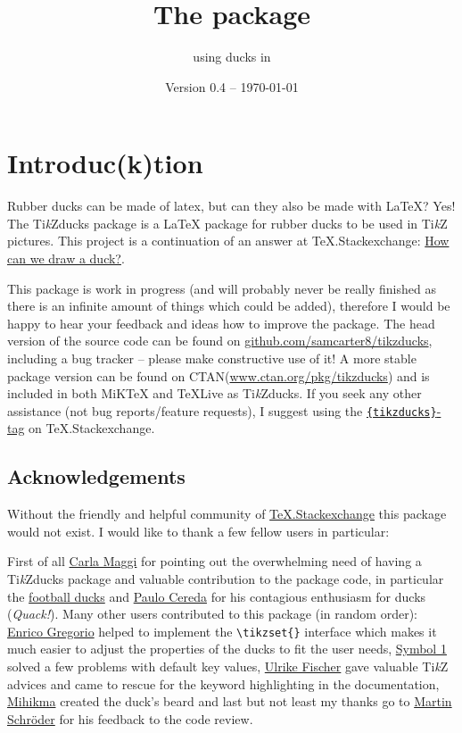 \documentclass[parskip=half]{scrartcl}
\title{The \texorpdfstring{\tikzducks}{tikzducks} package}
\subtitle{using ducks in \TikZ}
\author{%
	\texorpdfstring{\texttt{samcarter} (alias 
		\begin{tikzpicture}[scale=0.3,baseline=3pt]
			\duck[body=yellow!50!brown!50!white,
					longhair=red!50!brown, 
					jacket=blue!50!black]
		\end{tikzpicture})\\[0.8em]
		\url{https://github.com/samcarter8/tikzducks}\\
		\url{https://www.ctan.org/pkg/tikzducks}
	}{samcarter}}
\date{Version 0.4 -- \today}
\newcommand{\CTAN}{\textsc{CTAN}\xspace}
\newcommand{\TikZ}{Ti\emph{k}Z\xspace}
\newcommand{\tikzducks}{Ti\emph{k}Zducks\xspace}
\newcommand{\miktex}{MiK\TeX\xspace}
\newcommand{\texlive}{\TeX{}Live\xspace}
\begin{document}
\maketitle
\thispagestyle{scrheadings}

\section{Introduc(k)tion}
\label{intro}

Rubber ducks can be made of latex, but can they also be made with \LaTeX? Yes! The \tikzducks package is a \LaTeX{} package for rubber ducks to be used in \TikZ pictures. 
This project is a continuation of an answer at TeX.Stackexchange: \href{tex.stackexchange.com/a/347458/36296}{How can we draw a duck?}.

This package is work in progress (and will probably never be really finished as there is an infinite amount of things which could be added), therefore I would be happy to hear your feedback and ideas how to improve the package. 
The head version of the source code can be found on \url{github.com/samcarter8/tikzducks}, including a bug tracker -- please make constructive use of it! A more stable package version can be found on \CTAN (\url{www.ctan.org/pkg/tikzducks}) and is included in both \miktex and \texlive as \tikzducks. If you seek any other assistance (not bug reports/feature requests), I suggest using the \href{https://tex.stackexchange.com/questions/tagged/tikzducks}{\texttt{\{tikzducks\}}-tag} on TeX.Stackexchange.

\subsection{Acknowledgements}

Without the friendly and helpful community of \href{https://tex.stackexchange.com/}{TeX.Stackexchange} this package would not exist. I would like to thank a few fellow users in particular:

First of all \href{https://tex.stackexchange.com/users/101651/carlatex}{Carla Maggi} for pointing out the overwhelming need of having a \tikzducks package and valuable contribution to the package code, in particular the \hyperref[sec:footballducks]{football ducks} and \href{https://tex.stackexchange.com/users/3094/paulo-cereda}{Paulo Cereda} for his contagious enthusiasm for ducks (\emph{Quack!}). Many other users contributed to this package (in random order): \href{https://tex.stackexchange.com/users/4427/egreg}{Enrico Gregorio} helped to implement the \lstinline|\tikzset{}| interface which makes it much easier to adjust the properties of the ducks to fit the user needs, \href{https://tex.stackexchange.com/users/51022/symbol-1}{Symbol 1}  solved a few problems with default key values, \href{https://tex.stackexchange.com/users/2388/ulrike-fischer}{Ulrike Fischer} gave valuable \TikZ advices and came to rescue for the keyword highlighting in the documentation, \href{https://tex.stackexchange.com/users/148434/mihikma}{Mihikma} created the duck's beard and last but not least my thanks go to \href{https://tex.stackexchange.com/users/5763/martin-schr%c3%b6der}{Martin Schr\"oder} for his feedback to the code review.
\end{document}
